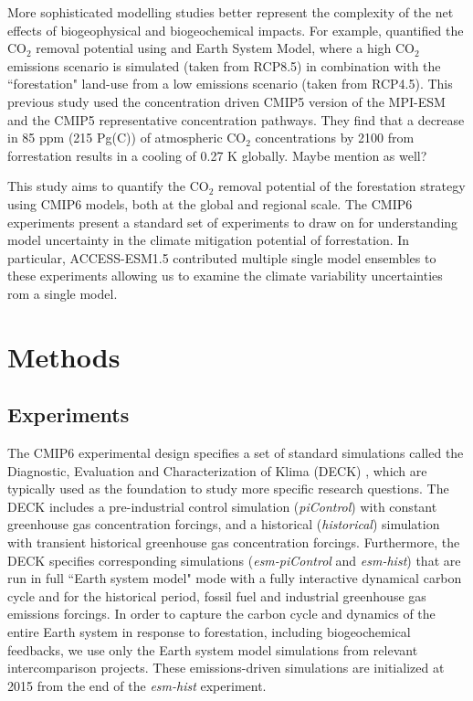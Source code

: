 \documentclass[]{article}
\begin{document}
More sophisticated modelling studies better represent the complexity of the net effects of biogeophysical and biogeochemical impacts.
For example, \cite{sonntag_reforestation_2016} quantified the CO$_2$ removal potential using and Earth System Model, where a high CO$_2$ emissions scenario is simulated (taken from RCP8.5) in combination with the ``forestation" land-use from a low emissions scenario (taken from RCP4.5).
This previous study used the concentration driven CMIP5 version of the MPI-ESM and the CMIP5 representative concentration pathways.
They find that a decrease in 85 ppm (215 Pg(C)) of atmospheric CO$_2$ concentrations by 2100 from forrestation results in a cooling of 0.27 K globally.
Maybe mention  \cite{sonntag_quantifying_2018} as well?

This study aims to quantify the CO$_2$ removal potential of the forestation strategy using CMIP6 models, both at the global and regional scale.
The CMIP6 experiments present a standard set of experiments to draw on for understanding model uncertainty in the climate mitigation potential of forrestation.
In particular, ACCESS-ESM1.5 contributed multiple single model ensembles to these experiments allowing us to examine the climate variability uncertainties rom a single model.

\section{Methods}

\subsection{Experiments}

The CMIP6 experimental design specifies a set of standard simulations called the Diagnostic, Evaluation and Characterization of Klima (DECK) \parencite{eyring_overview_2016}, which are typically used as the foundation to study more specific research questions.
The DECK includes a pre-industrial control simulation (\textit{piControl}) with constant greenhouse gas concentration forcings, and a historical (\textit{historical}) simulation with transient historical greenhouse gas concentration forcings.
Furthermore, the DECK specifies corresponding simulations (\textit{esm-piControl} and \textit{esm-hist}) that are run in full ``Earth system model" mode with a fully interactive dynamical carbon cycle and for the historical period, fossil fuel and industrial greenhouse gas emissions forcings.
In order to capture the carbon cycle and dynamics of the entire Earth system in response to forestation, including biogeochemical feedbacks, we use only the Earth system model simulations from relevant intercomparison projects. These emissions-driven simulations are initialized at 2015 from the end of the \textit{esm-hist} experiment.
\end{document}
